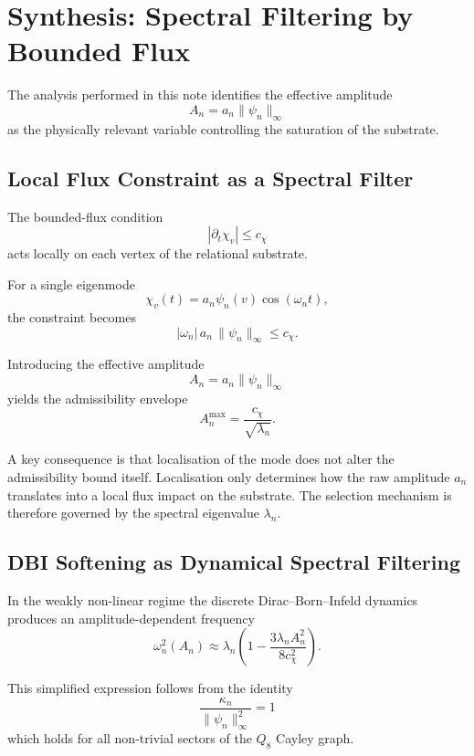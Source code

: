 \section{Synthesis: Spectral Filtering by Bounded Flux}
  \label{sec:synthesis-spectral-filtering-by-bounded-flux}

  The analysis performed in this note identifies the effective amplitude
  \[
    A_n = a_n \|\psi_n\|_\infty
  \]
  as the physically relevant variable controlling the saturation of the
  substrate.

  \subsection{Local Flux Constraint as a Spectral Filter}

    The bounded-flux condition
    \[
      |\partial_t \chi_v| \le c_\chi
    \]
    acts locally on each vertex of the relational substrate.

    For a single eigenmode
    \[
      \chi_v(t) = a_n \psi_n(v) \cos(\omega_n t),
    \]
    the constraint becomes
    \[
      |\omega_n|\,a_n\,\|\psi_n\|_\infty \le c_\chi.
    \]

    Introducing the effective amplitude
    \[
      A_n = a_n \|\psi_n\|_\infty
    \]
    yields the admissibility envelope
    \[
      A_n^{\max} = \frac{c_\chi}{\sqrt{\lambda_n}}.
    \]

    A key consequence is that localisation of the mode does not alter the
    admissibility bound itself.
    Localisation only determines how the raw amplitude $a_n$ translates into
    a local flux impact on the substrate.
    The selection mechanism is therefore governed by the spectral
    eigenvalue $\lambda_n$.

  \subsection{DBI Softening as Dynamical Spectral Filtering}

    In the weakly non-linear regime the discrete Dirac--Born--Infeld dynamics
    produces an amplitude-dependent frequency
    \[
      \omega_n^2(A_n)
      \approx
      \lambda_n
      \left(
        1 -
        \frac{3\lambda_n A_n^2}{8c_\chi^2}
      \right).
    \]

    This simplified expression follows from the identity
    \[
      \frac{\kappa_n}{\|\psi_n\|_\infty^2}=1
    \]
    which holds for all non-trivial sectors of the $Q_8$ Cayley graph.

